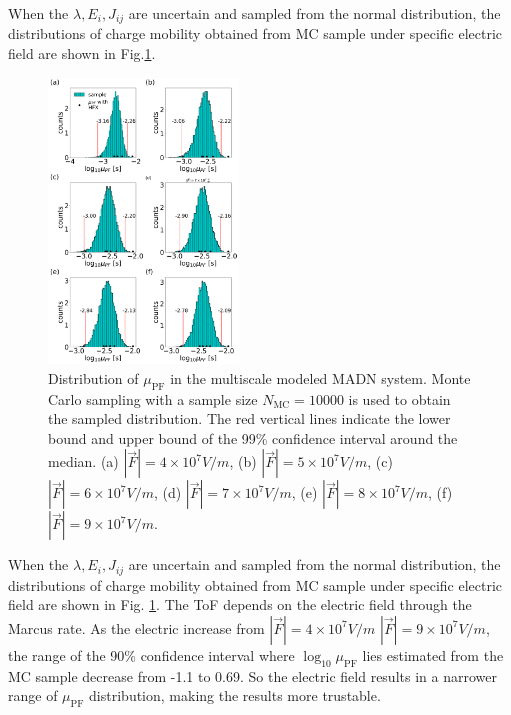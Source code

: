 \documentclass[%
 reprint,
 amsmath,amssymb,
 aps,
]{revtex4-2}
\begin{document}
When the $\lambda, E_i, J_{ij}$ are uncertain and sampled from the normal distribution, the distributions of charge mobility obtained from MC sample under specific electric field are shown in Fig.\ref{fig:fig_mle_withE_mu2_ave}.
%
\begin{figure}
    \centering
    \includegraphics[width=0.45\textwidth]{figs/fig_mle_withE_mu2_ave.pdf}
    \caption{Distribution of $\mu_\text{PF}$ in the multiscale modeled MADN system.
    Monte Carlo sampling with a sample size $N_\text{MC}=10000$ is used to obtain the sampled distribution. The red vertical lines indicate the lower bound and upper bound of the 99\% confidence interval around the median. (a) $|\vec{F}|=4 \times 10^7 \unit{V/m}$, (b) $|\vec{F}|=5 \times 10^7 \unit{V/m}$, (c) $|\vec{F}|=6 \times 10^7 \unit{V/m}$, (d) $|\vec{F}|=7 \times 10^7 \unit{V/m}$, (e) $|\vec{F}|=8 \times 10^7 \unit{V/m}$, (f) $|\vec{F}|=9 \times 10^7 \unit{V/m}$.}
    \label{fig:fig_mle_withE_mu2_ave}
\end{figure}
%

When the $\lambda, E_i, J_{ij}$ are uncertain and sampled from the normal distribution, the distributions of charge mobility obtained from MC sample under specific electric field are shown in Fig. \ref{fig:fig_mle_withE_mu2_ave}. The ToF depends on the electric field through the Marcus rate. As the electric increase from $|\vec{F}|=4 \times 10^7 \unit{V/m}$
$|\vec{F}|=9 \times 10^7 \unit{V/m}$, the
range of the 90\% confidence interval where $\log_{10} \mu_\text{PF}$ lies
estimated from the MC sample decrease from -1.1 to 0.69.
So the electric field results in a narrower range
of $\mu_\text{PF}$ distribution, making the results more trustable.
\end{document}
